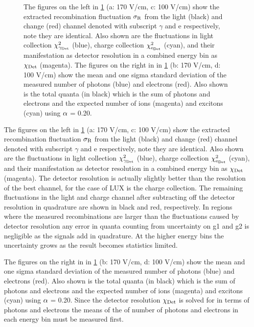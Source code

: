 \begin{figure}[h!]
\caption{The figures on the left in \ref{fig:R_Flucs_Quanta} (a: 170 V/cm, c: 100 V/cm) show the extracted recombination fluctuation $\rm \sigma_R$ from the light (black) and change (red) channel denoted with subscript $\gamma$ and e respectively, note they are identical. Also shown are the fluctuations in light collection $\rm \chi_{\gamma_{Det}}^2$ (blue), charge collection $\rm \chi_{e_{Det}}^2$ (cyan), and their manifestation as detector resolution in a combined energy bin as $\rm \chi_{Det}$ (magenta). The figures on the right in in \ref{fig:R_Flucs_Quanta} (b: 170 V/cm, d: 100 V/cm) show the mean and one sigma standard deviation of the measured number of photons (blue) and electrons (red). Also shown is the total quanta (in black) which is the sum of photons and electrons and the expected number of ions (magenta) and excitons (cyan) using $\rm \alpha$ = 0.20.}
\label{fig:R_Flucs_Quanta}
\end{figure}
\renewcommand{\baselinestretch}{2}
\small\normalsize

The figures on the left in \ref{fig:R_Flucs_Quanta} (a: 170 V/cm, c: 100 V/cm)  show the extracted recombination fluctuation $\rm \sigma_R$ from the light (black) and change (red) channel denoted with subscript $\gamma$ and e respectively, note they are identical. Also shown are the fluctuations in light collection $\rm \chi_{\gamma_{Det}}^2$ (blue), charge collection $\rm \chi_{e_{Det}}^2$ (cyan), and their manifestation as detector resolution in a combined energy bin as $\rm \chi_{Det}$ (magenta). The detector resolution is actually slightly better than the resolution of the best channel, for the case of LUX is the charge collection. The remaining fluctuations in the light and charge channel after subtracting off the detector resolution in quadrature are shown in black and red, respectively. In regions where the measured recombinations are larger than the fluctuations caused by detector resolution any error in quanta counting from uncertainty on g1 and g2 is negligible as the signals add in quadrature. At the higher energy bins the uncertainty grows as the result becomes statistics limited. 

The figures on the right in in \ref{fig:R_Flucs_Quanta} (b: 170 V/cm, d: 100 V/cm) show the mean and one sigma standard deviation of the measured number of photons (blue) and electrons (red). Also shown is the total quanta (in black) which is the sum of photons and electrons and the expected number of ions (magenta) and excitons (cyan) using $\rm \alpha$ = 0.20. Since the detector resolution $\rm \chi_{Det}$ is solved for in terms of photons and electrons the means of the of number of photons and electrons in each energy bin must be measured first.

